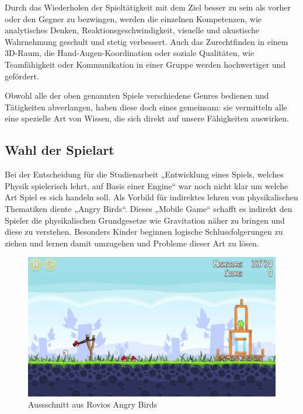 Durch das Wiederholen der Spieltätigkeit mit dem Ziel besser zu sein als vorher oder den Gegner zu bezwingen, werden die einzelnen Kompetenzen, wie analytisches Denken, Reaktionsgeschwindigkeit, visuelle und akustische Wahrnehmung geschult und stetig verbessert. Auch das Zurechtfinden in einem 3D-Raum, die Hand-Augen-Koordination oder soziale Qualitäten, wie Teamfähigkeit oder Kommunikation in einer Gruppe werden hochwertiger und gefördert. 

Obwohl alle der oben genannten Spiele verschiedene Genres bedienen und Tätigkeiten abverlangen, haben diese doch eines gemeinsam: sie vermitteln alle eine spezielle Art von Wissen, die sich direkt auf unsere Fähigkeiten auswirken. 
\newpage
\subsection{Wahl der Spielart}
Bei der Entscheidung für die Studienarbeit „Entwicklung eines Spiels, welches Physik spielerisch lehrt, auf Basis einer Engine“ war noch nicht klar um welche Art Spiel es sich handeln soll. Als Vorbild für indirektes lehren von physikalischen Thematiken diente „Angry Birds“. Dieses „Mobile Game“ schafft es indirekt den Spieler die physikalischen Grundgesetze wie Gravitation näher zu bringen und diese zu verstehen. Besonders Kinder beginnen logische Schlussfolgerungen zu ziehen und lernen damit umzugehen und  Probleme dieser Art zu lösen.
\begin{figure}[H]
    \centering
    \includegraphics[scale=0.15, center]{res/angry_birds.jpg}
    \caption[Aussschnitt aus Rovios Angry Birds]{Aussschnitt aus Rovios Angry Birds\footnotemark}
    \label{Angry Birds}
\end{figure}

